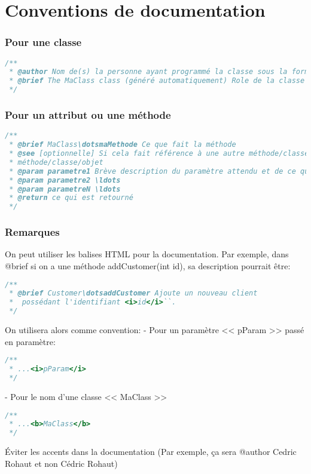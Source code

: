 \section{Conventions de documentation}\label{conventions-de-documentation}

\subsubsection{Pour une classe}\label{pour-une-classe}


\begin{lstlisting}[language=C++,numbers=none]
/**
 * @author Nom de(s) la personne ayant programmé la classe sous la forme: Prénom Nom
 * @brief The MaClass class (généré automatiquement) Role de la classe 
 */
\end{lstlisting}

\subsubsection{Pour un attribut ou une méthode}
\begin{lstlisting}[language=C++,numbers=none]
/**
 * @brief MaClass\dotsmaMethode Ce que fait la méthode
 * @see [optionnelle] Si cela fait référence à une autre méthode/classe/objet alors on écrit le nom de cette
 * méthode/classe/objet
 * @param parametre1 Brève description du paramètre attendu et de ce qu'il représente 
 * @param parametre2 \ldots
 * @param parametreN \ldots
 * @return ce qui est retourné
 */
\end{lstlisting}

\subsubsection{Remarques}
On peut utiliser les balises HTML pour la documentation. Par exemple, dans @brief si on a une méthode addCustomer(int id), sa description pourrait
être: 
\begin{lstlisting}[language=C++,numbers=none]
/**
 * @brief Customer\dotsaddCustomer Ajoute un nouveau client 
 *  possédant l'identifiant <i>id</i>``. 
 */
\end{lstlisting}

On utilisera alors comme convention: - Pour un paramètre << pParam >> passé en paramètre: 
\begin{lstlisting}[language=C++,numbers=none]
/**
 * ...<i>pParam</i>
 */
\end{lstlisting}

- Pour le nom d'une classe << MaClass >> 
\begin{lstlisting}[language=C++,numbers=none]
/**
 * ...<b>MaClass</b>
 */
\end{lstlisting}

\begin{attention}
Éviter les accents dans la documentation (Par exemple, ça sera @author Cedric Rohaut et non Cédric Rohaut)
\end{attention}
